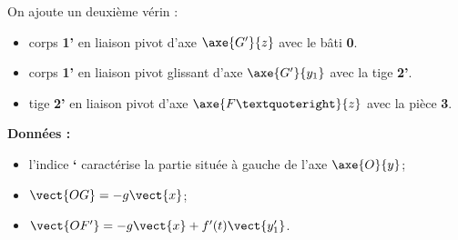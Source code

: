 %
%
%
%
%
%

On ajoute un deuxième vérin :
\begin{itemize}
\item corps \textbf{1’} en liaison pivot d’axe $\axe{G'}{z}$ avec le bâti \textbf{0}.
\item corps \textbf{1’} en liaison pivot glissant d’axe $\axe{G'}{y_1}$ avec la tige \textbf{2’}.
\item tige \textbf{2’} en liaison pivot d’axe $\axe{F’}{z}$ avec la pièce \textbf{3}.
\end{itemize}


\textbf{Données : } 
\begin{itemize}
\item l’indice \textbf{`} caractérise la partie située à gauche de l’axe $\axe{O}{y}$;
\item $\vect{OG} = -g\vect{x}$;
\item $\vect{OF'}=-g \vect{x} + f'(t)\vect{y_1'}$.
\end{itemize}





